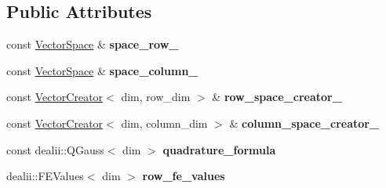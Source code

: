 \subsection*{\-Public \-Attributes}
\begin{DoxyCompactItemize}
\item 
\hypertarget{structSpacy_1_1dealII_1_1Detail_1_1LocalAssemblyBase_a56425b34eab9e4ff115a0510b4ef8d80}{const \hyperlink{classSpacy_1_1VectorSpace}{\-Vector\-Space} \& {\bfseries space\-\_\-row\-\_\-}}\label{structSpacy_1_1dealII_1_1Detail_1_1LocalAssemblyBase_a56425b34eab9e4ff115a0510b4ef8d80}

\item 
\hypertarget{structSpacy_1_1dealII_1_1Detail_1_1LocalAssemblyBase_ac7e2cb1ae6e82e7b742ba445424f95f4}{const \hyperlink{classSpacy_1_1VectorSpace}{\-Vector\-Space} \& {\bfseries space\-\_\-column\-\_\-}}\label{structSpacy_1_1dealII_1_1Detail_1_1LocalAssemblyBase_ac7e2cb1ae6e82e7b742ba445424f95f4}

\item 
\hypertarget{structSpacy_1_1dealII_1_1Detail_1_1LocalAssemblyBase_a7e6212a0a69a567a098b37be7e84c773}{const \hyperlink{classSpacy_1_1dealII_1_1VectorCreator}{\-Vector\-Creator}$<$ dim, \*
row\-\_\-dim $>$ \& {\bfseries row\-\_\-space\-\_\-creator\-\_\-}}\label{structSpacy_1_1dealII_1_1Detail_1_1LocalAssemblyBase_a7e6212a0a69a567a098b37be7e84c773}

\item 
\hypertarget{structSpacy_1_1dealII_1_1Detail_1_1LocalAssemblyBase_a526dfed72a82cc827edc8ca4cd066ac2}{const \hyperlink{classSpacy_1_1dealII_1_1VectorCreator}{\-Vector\-Creator}$<$ dim, \*
column\-\_\-dim $>$ \& {\bfseries column\-\_\-space\-\_\-creator\-\_\-}}\label{structSpacy_1_1dealII_1_1Detail_1_1LocalAssemblyBase_a526dfed72a82cc827edc8ca4cd066ac2}

\item 
\hypertarget{structSpacy_1_1dealII_1_1Detail_1_1LocalAssemblyBase_a64d2a187dd531b701364de8e27a757c5}{const dealii\-::\-Q\-Gauss$<$ dim $>$ {\bfseries quadrature\-\_\-formula}}\label{structSpacy_1_1dealII_1_1Detail_1_1LocalAssemblyBase_a64d2a187dd531b701364de8e27a757c5}

\item 
\hypertarget{structSpacy_1_1dealII_1_1Detail_1_1LocalAssemblyBase_a21eb2f046a9126dc88da9f24f3d32c7e}{dealii\-::\-F\-E\-Values$<$ dim $>$ {\bfseries row\-\_\-fe\-\_\-values}}\label{structSpacy_1_1dealII_1_1Detail_1_1LocalAssemblyBase_a21eb2f046a9126dc88da9f24f3d32c7e}


\end{DoxyCompactItemize}
